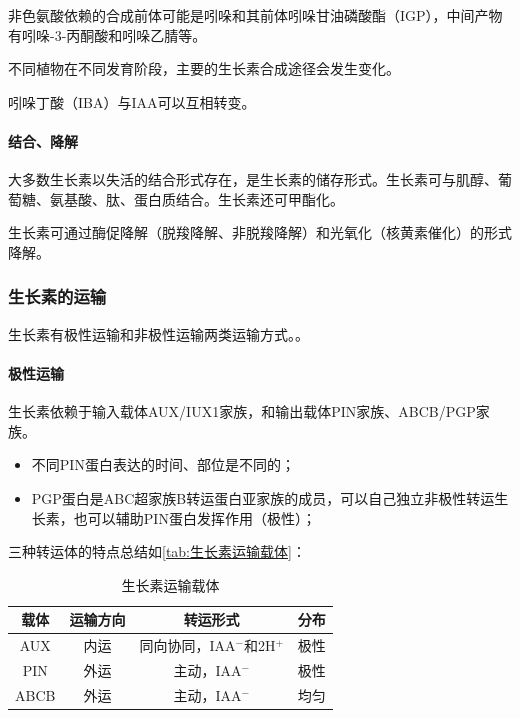 非色氨酸依赖的合成前体可能是吲哚和其前体吲哚甘油磷酸酯（IGP），中间产物有吲哚-3-丙酮酸和吲哚乙腈等。

不同植物在不同发育阶段，主要的生长素合成途径会发生变化。

吲哚丁酸（IBA）与IAA可以互相转变。

\paragraph{结合、降解}

大多数生长素以失活的结合形式存在，是生长素的储存形式。生长素可与肌醇、葡萄糖、氨基酸、肽、蛋白质结合。生长素还可甲酯化。

生长素可通过酶促降解（脱羧降解、非脱羧降解）和光氧化（核黄素催化）的形式降解。

\subsubsection{生长素的运输}

生长素有极性运输和非极性运输两类运输方式。。

\paragraph{极性运输}

生长素依赖于输入载体AUX/IUX1家族，和输出载体PIN家族、ABCB/PGP家族。

\begin{itemize}
	\item 不同PIN蛋白表达的时间、部位是不同的；
	\item PGP蛋白是ABC超家族B转运蛋白亚家族的成员，可以自己独立非极性转运生长素，也可以辅助PIN蛋白发挥作用（极性）；
\end{itemize}

三种转运体的特点总结如\autoref{tab:生长素运输载体}：

\begin{table}[htbp]
	\centering
	\begin{tabularx}{\textwidth}{|c|C|c|C|}
		\hline
		\textbf{载体} & \textbf{运输方向} & \textbf{转运形式} & \textbf{分布} \\ \hline
		AUX & 内运 & 同向协同，IAA$^{-}$和2H$^{+}$ & 极性 \\ \hline
		PIN & 外运 & 主动，IAA$^{-}$ & 极性 \\ \hline
		ABCB & 外运 & 主动，IAA$^{-}$ & 均匀 \\ \hline
	\end{tabularx}
	\caption{生长素运输载体}
	\label{tab:生长素运输载体}
\end{table}

